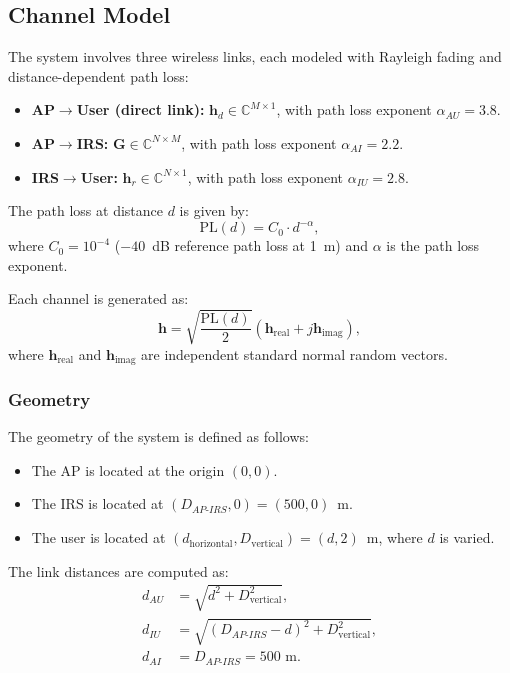 \documentclass[12pt,a4paper]{article}
\newcommand{\mat}[1]{\mathbf{#1}}
\begin{document}
\subsection{Channel Model}

The system involves three wireless links, each modeled with Rayleigh fading and distance-dependent path loss:

\begin{itemize}
    \item \textbf{AP$\to$User (direct link):} $\mat{h}_d \in \mathbb{C}^{M \times 1}$, with path loss exponent $\alpha_{AU} = 3.8$.
    \item \textbf{AP$\to$IRS:} $\mat{G} \in \mathbb{C}^{N \times M}$, with path loss exponent $\alpha_{AI} = 2.2$.
    \item \textbf{IRS$\to$User:} $\mat{h}_r \in \mathbb{C}^{N \times 1}$, with path loss exponent $\alpha_{IU} = 2.8$.
\end{itemize}

The path loss at distance $d$ is given by:
\begin{equation}
    \text{PL}(d) = C_0 \cdot d^{-\alpha},
    \label{eq:path_loss}
\end{equation}
where $C_0 = 10^{-4}$ ($-40$~dB reference path loss at 1~m) and $\alpha$ is the path loss exponent.

Each channel is generated as:
\begin{equation}
    \mat{h} = \sqrt{\frac{\text{PL}(d)}{2}} \left(\mat{h}_{\text{real}} + j\mat{h}_{\text{imag}}\right),
\end{equation}
where $\mat{h}_{\text{real}}$ and $\mat{h}_{\text{imag}}$ are independent standard normal random vectors.

\subsubsection{Geometry}

The geometry of the system is defined as follows:
\begin{itemize}
    \item The AP is located at the origin $(0, 0)$.
    \item The IRS is located at $(D_{AP\text{-}IRS}, 0) = (500, 0)$~m.
    \item The user is located at $(d_{\text{horizontal}}, D_{\text{vertical}}) = (d, 2)$~m, where $d$ is varied.
\end{itemize}

The link distances are computed as:
\begin{align}
    d_{AU} &= \sqrt{d^2 + D_{\text{vertical}}^2}, \\
    d_{IU} &= \sqrt{(D_{AP\text{-}IRS} - d)^2 + D_{\text{vertical}}^2}, \\
    d_{AI} &= D_{AP\text{-}IRS} = 500 \text{ m}.
\end{align}
\end{document}
